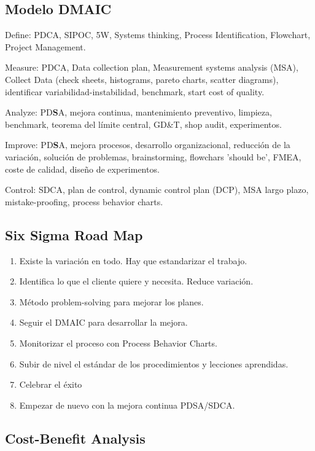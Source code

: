 \documentclass[]{article}
\begin{document}
\subsection{Modelo DMAIC}
Define: PDCA, SIPOC, 5W, Systems thinking, Process Identification, Flowchart, Project Management.

Measure: PDCA, Data collection plan, Measurement systems analysis (MSA), Collect Data (check sheets, histograms, pareto charts, scatter diagrams), identificar variabilidad-instabilidad, benchmark, start cost of quality. 

Analyze: PD\textbf{S}A, mejora continua, mantenimiento preventivo, limpieza, benchmark, teorema del límite central, GD\&T, shop audit, experimentos. 

Improve: PD\textbf{S}A, mejora procesos, desarrollo organizacional, reducción de la variación, solución de problemas, brainstorming, flowchars 'should be', FMEA, coste de calidad, diseño de experimentos. 

Control: SDCA, plan de control, dynamic control plan (DCP), MSA largo plazo, mistake-proofing, process behavior charts.

\subsection{Six Sigma Road Map}

\begin{enumerate}
	\item Existe la variación en todo. Hay que estandarizar el trabajo.
	\item Identifica lo que el cliente quiere y necesita. Reduce variación.
	\item Método problem-solving para mejorar los planes.
	\item Seguir el DMAIC para desarrollar la mejora.
	\item Monitorizar el proceso con Process Behavior Charts.
	\item Subir de nivel el estándar de los procedimientos y lecciones aprendidas.
	\item Celebrar el éxito
	\item Empezar de nuevo con la mejora continua PDSA/SDCA.
\end{enumerate}

\subsection{Cost-Benefit Analysis}
\end{document}
